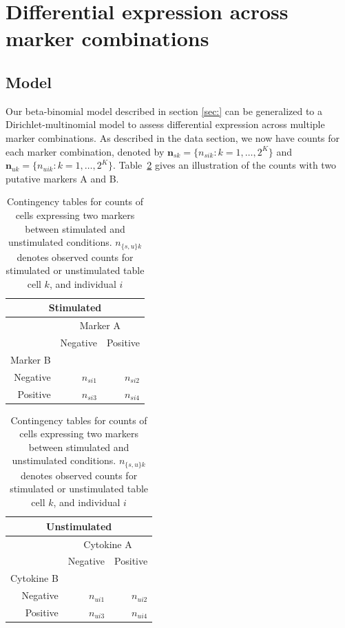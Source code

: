 \documentclass[11pt]{article}
\begin{document}
\section{Differential expression across marker combinations}
\subsection{Model}
Our beta-binomial model described in section \ref{sec:} can be generalized to a Dirichlet-multinomial model to assess differential expression across multiple marker combinations. As described in the data section, we now have counts for each marker combination, denoted by  $\mathbf{n}_{sk}=\{n_{sik}: k=1,\dots,2^K\}$ and $\mathbf{n}_{uk}=\{n_{uik}: k=1,\dots,2^K\}$. Table~\ref{tab:multdir} gives an illustration of the counts with two putative markers A and B.

\begin{table}[h]
\centering
\parbox{0.8\linewidth}{
\caption{Contingency tables for counts of cells expressing two markers between stimulated and unstimulated conditions. $n_{\{s,u\}k}$ denotes observed counts for stimulated or unstimulated table cell $k$, and individual $i$  }\label{tab:multdir}
\begin{minipage}[b]{0.5\linewidth}
\centering
\begin{tabular}{rrr}
\multicolumn{3}{c}{Stimulated}\\
  \hline
\multicolumn{1}{l}{}&
\multicolumn{2}{c}{Marker A}\\
 & Negative & Positive \\ 
 \multicolumn{1}{l}{Marker B}&&\\
  \hline
Negative &   $n_{si1}$ &   $n_{si2}$ \\ 
Positive &   $n_{si3}$ &   $n_{si4}$ \\ 
   \hline
\end{tabular}
\end{minipage}
\begin{minipage}[b]{0.5\linewidth}
\centering
\begin{tabular}{rrr}
\multicolumn{3}{c}{Unstimulated}\\
  \hline
\multicolumn{1}{l}{}&
\multicolumn{2}{c}{Cytokine A}\\
 & Negative & Positive \\ 
 \multicolumn{1}{l}{Cytokine B}&&\\
  \hline
Negative &   $n_{ui1}$ &   $n_{ui2}$ \\ 
Positive &   $n_{ui3}$ &   $n_{ui4}$ \\ 
   \hline
\end{tabular}
\end{minipage}
}
\end{table}
\end{document}
